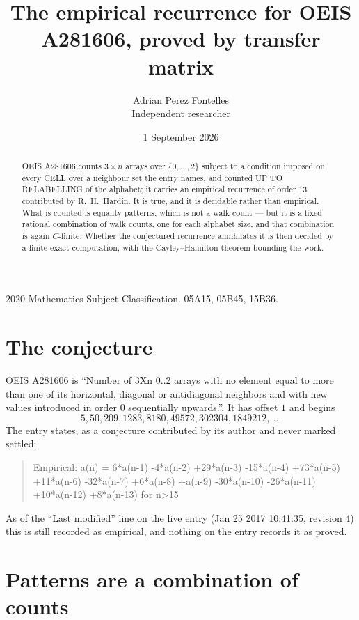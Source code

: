 \documentclass[11pt,a4paper]{article}
\title{The empirical recurrence for OEIS A281606, proved by transfer matrix}
\author{Adrian Perez Fontelles\\ \small Independent researcher}
\date{1 September 2026}
\theoremstyle{plain}
\theoremstyle{definition}
\begin{document}
\maketitle

\begin{abstract}
OEIS A281606 counts $3\times n$ arrays over $\{0,\dots,2\}$ subject to a condition imposed on
every CELL over a neighbour set the entry names, and counted UP TO RELABELLING of the
alphabet; it carries an empirical recurrence of order $13$ contributed by
R.~H.~Hardin. It is true, and it is decidable rather than empirical. What is counted is
equality patterns, which is not a walk count --- but it is a fixed rational combination of
walk counts, one for each alphabet size, and that combination is again $C$-finite. Whether the
conjectured recurrence annihilates it is then decided by a finite exact computation, with the
Cayley--Hamilton theorem bounding the work.
\end{abstract}

\noindent\small 2020 Mathematics Subject Classification. 05A15, 05B45, 15B36.\normalsize

\section{The conjecture}

OEIS A281606 is ``Number of 3Xn 0..2 arrays with no element equal to more than one of its horizontal, diagonal or antidiagonal neighbors and with new values introduced in order 0 sequentially upwards.''. It has offset $1$ and begins
\[
5, 50, 209, 1283, 8180, 49572, 302304, 1849212,\ \dots
\]
The entry states, as a conjecture contributed by its author and never marked settled:
\begin{quote}
Empirical: a(n) = 6*a(n-1) -4*a(n-2) +29*a(n-3) -15*a(n-4) +73*a(n-5) +11*a(n-6) -32*a(n-7) +6*a(n-8) +a(n-9) -30*a(n-10) -26*a(n-11) +10*a(n-12) +8*a(n-13) for n>15
\end{quote}
As of the ``Last modified'' line on the live entry (Jan 25 2017 10:41:35, revision 4) this is still
recorded as empirical, and nothing on the entry records it as proved.

\section{Patterns are a combination of counts}
\end{document}
